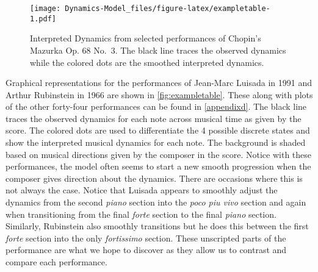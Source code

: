 \documentclass[12pt]{article}
\begin{document}
\begin{figure}
\centering
\texttt{[image: Dynamics-Model\_files/figure-latex/exampletable-1.pdf]}
\caption{\label{fig:exampletable}Interpreted Dynamics from selected
performances of Chopin's Mazurka Op. 68 No.~3. The black line traces the
observed dynamics while the colored dots are the smoothed interpreted
dynamics.}
\end{figure}

Graphical representations for the performances of Jean-Marc Luisada in
1991 and Arthur Rubinstein in 1966 are shown in
\autoref{fig:exampletable}. These along with plots of the other
forty-four performances can be found in \autoref{appendixd}. The black
line traces the observed dynamics for each note across musical time as
given by the score. The colored dots are used to differentiate the 4
possible discrete states and show the interpreted musical dynamics for
each note. The background is shaded based on musical directions given by
the composer in the score. Notice with these performances, the model
often seems to start a new smooth progression when the composer gives
direction about the dynamics. There are occasions where this is not
always the case. Notice that Luisada appears to smoothly adjust the
dynamics from the second \emph{piano} section into the
\emph{poco piu vivo} section and again when transitioning from the final
\emph{forte} section to the final \emph{piano} section. Similarly,
Rubinstein also smoothly transitions but he does this between the first
\emph{forte} section into the only \emph{fortissimo} section. These
unscripted parts of the performance are what we hope to discover as they
allow us to contrast and compare each performance.
\end{document}
